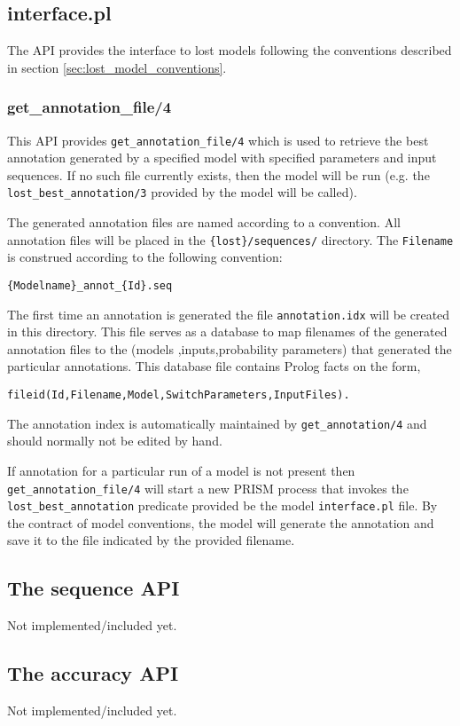 \documentclass{article}
\begin{document}
\subsection{interface.pl}

The API provides the interface to lost models following the
conventions described in section \ref{sec:lost_model_conventions}.

\subsubsection{get\_annotation\_file/4}

This API provides \texttt{get\_annotation\_file/4} which is used to
retrieve the best annotation generated by a specified model with
specified parameters and input sequences. If no such file currently
exists, then the model will be run (e.g. the
\texttt{lost\_best\_annotation/3} provided by the model will be
called).


The generated annotation files are named according to a convention. 
All annotation files will be placed in the \texttt{\{lost\}/sequences/}
directory. 
The \texttt{Filename} is construed according to the following convention:
\begin{verbatim}
{Modelname}_annot_{Id}.seq
\end{verbatim}

The first time an annotation is generated the file
\texttt{annotation.idx} will be created in this directory. This file
serves as a database to map filenames of the generated annotation
files to the (models ,inputs,probability parameters) that generated
the particular annotations. This database file contains Prolog facts 
on the form,
\begin{verbatim}
fileid(Id,Filename,Model,SwitchParameters,InputFiles).
\end{verbatim}

The annotation index is automatically maintained by
\texttt{get\_annotation/4} and should normally not be edited by hand.

If annotation for a particular run of a model is not present then
\texttt{get\_annotation\_file/4} will start a new PRISM process 
that invokes the \texttt{lost\_best\_annotation} predicate provided
be the model \texttt{interface.pl} file. By the contract of model 
conventions, the model will generate the annotation and save it 
to the file indicated by the provided filename.

\subsection{The sequence API}

Not implemented/included yet.

\subsection{The accuracy API}

Not implemented/included yet.
\end{document}
